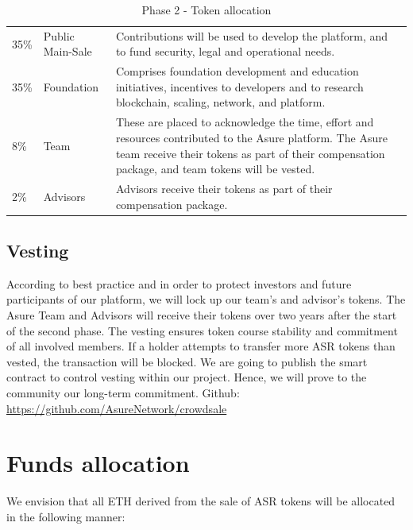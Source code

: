 \begin{table}[H]
\begin{tabular}{llp{}l}
  35\% & Public Main-Sale & Contributions will be used to develop the platform, and to fund security, legal and operational needs. \\
  35\% & Foundation & Comprises foundation development and education initiatives, incentives to developers and to research blockchain, scaling, network, and platform.\\
  8\% & Team  & These are placed to acknowledge the time, effort and resources contributed to the Asure platform.  The Asure team receive their tokens as part of their compensation package, and team tokens will be vested.\\
  2\% & Advisors & Advisors receive their tokens as part of their compensation package.
\end{tabular}
\caption{\label{tab:table-name} Phase 2 - Token allocation}
\end{table}

\subsection{Vesting}
According to best practice and in order to protect investors and future participants of our platform, we will lock up our team’s and advisor's tokens. The Asure Team and Advisors will receive their tokens over two years after the start of the second phase.
The vesting ensures token course stability and commitment of all involved members. If a holder attempts to transfer more ASR tokens than vested, the transaction will be blocked.
We are going to publish the smart contract to control vesting within our project. Hence, we will prove to the community our long-term commitment.
\newline\newline
Github: \url{https://github.com/AsureNetwork/crowdsale}

\newpage
\section{Funds allocation}

We envision that all ETH derived from the sale of ASR tokens will be allocated in the following manner:
\newline\newline

